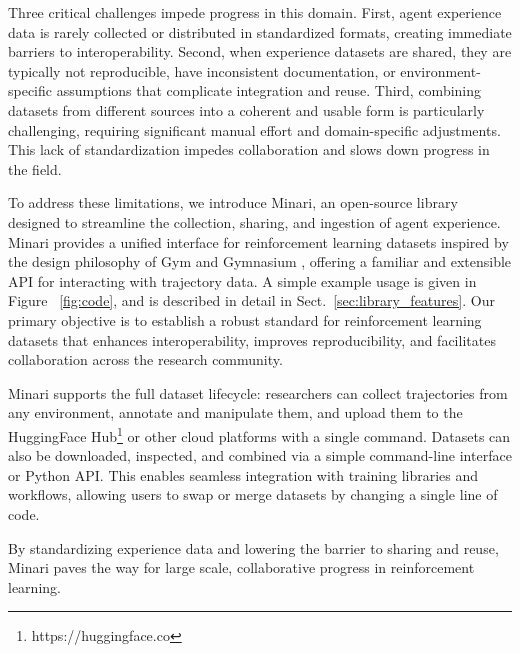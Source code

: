 \documentclass{article}
\begin{document}
Three critical challenges impede progress in this domain. First, agent experience data is rarely collected or distributed in standardized formats, creating immediate barriers to interoperability. Second, when experience datasets are shared, they are typically not reproducible, have inconsistent documentation, or environment-specific assumptions that complicate integration and reuse. Third, combining datasets from different sources into a coherent and usable form is particularly challenging, requiring significant manual effort and domain-specific adjustments. This lack of standardization impedes collaboration and slows down progress in the field. 

To address these limitations, we introduce Minari, an open-source library designed to streamline the collection, sharing, and ingestion of agent experience. Minari provides a unified interface for reinforcement learning datasets inspired by the design philosophy of Gym and Gymnasium \cite{gym, gymnasium}, offering a familiar and extensible API for interacting with trajectory data. A simple example usage is given in Figure ~\ref{fig:code}, and is described in detail in Sect.~\ref{sec:library_features}. Our primary objective is to establish a robust standard for reinforcement learning datasets that enhances interoperability, improves reproducibility, and facilitates collaboration across the research community.

Minari supports the full dataset lifecycle: researchers can collect trajectories from any environment, annotate and manipulate them, and upload them to the HuggingFace Hub\footnote{https://huggingface.co} or other cloud platforms with a single command. Datasets can also be downloaded, inspected, and combined via a simple command-line interface or Python API. This enables seamless integration with training libraries and workflows, allowing users to swap or merge datasets by changing a single line of code.

By standardizing experience data and lowering the barrier to sharing and reuse, Minari paves the way for large scale, collaborative progress in reinforcement learning.
\end{document}
